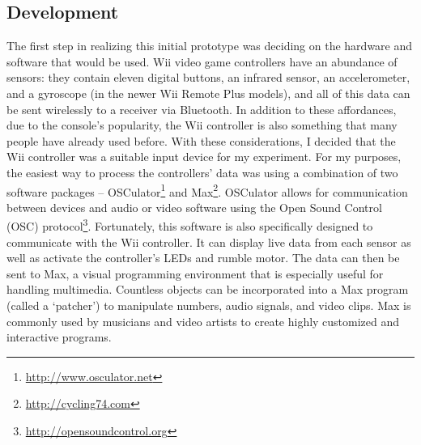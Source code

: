 
\subsection{Development}

The first step in realizing this initial prototype was deciding on the hardware and software that would be used. Wii video game controllers have an abundance of sensors: they contain eleven digital buttons, an infrared sensor, an accelerometer, and a gyroscope (in the newer Wii Remote Plus models), and all of this data can be sent wirelessly to a receiver via Bluetooth. In addition to these affordances, due to the console's popularity, the Wii controller is also something that many people have already used before. With these considerations, I decided that the Wii controller was a suitable input device for my experiment. For my purposes, the easiest way to process the controllers' data was using a combination of two software packages -- OSCulator\footnote{\url{http://www.osculator.net}} and Max\footnote{\url{http://cycling74.com}}. OSCulator allows for communication between devices and audio or video software using the Open Sound Control (OSC) protocol\footnote{\url{http://opensoundcontrol.org}}. Fortunately, this software is also specifically designed to communicate with the Wii controller. It can display live data from each sensor as well as activate the controller's LEDs and rumble motor. The data can then be sent to Max, a visual programming environment that is especially useful for handling multimedia. Countless objects can be incorporated into a Max program (called a `patcher') to manipulate numbers, audio signals, and video clips. Max is commonly used by musicians and video artists to create highly customized and interactive programs.

